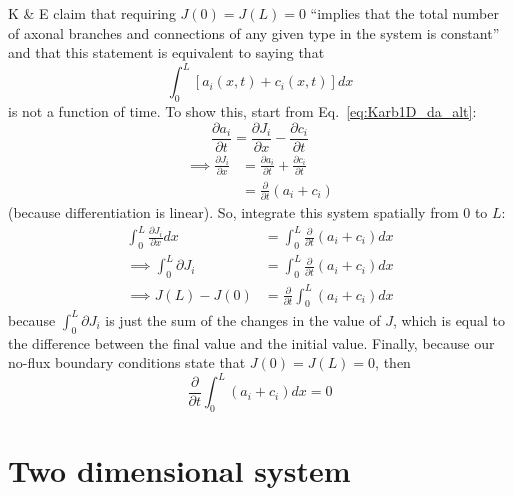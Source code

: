 \documentclass[11pt, a4paper]{article}
\begin{document}
K \& E claim
that requiring $J(0)=J(L)=0$ ``implies that the total number of axonal
branches and connections of any given type in the system is
constant'' and that this statement is equivalent to saying that
%
\begin{equation}
\int_{0}^{L} [a_i(x,t) + c_i(x,t)] dx
\end{equation}
%
is not a function of time. To show this, start from
Eq.~\ref{eq:Karb1D_da_alt}:
%
\begin{equation}
\frac{\partial a_i}{\partial t} = \frac{\partial J_i}{\partial
x} - \frac{\partial c_i}{\partial t}
\end{equation}
%
\begin{equation}
\begin{split}
\implies \frac{\partial J_i}{\partial x} & =
\frac{\partial a_i}{\partial t}
+ \frac{\partial c_i}{\partial t} \\
& = \frac{\partial}{\partial t}(a_i + c_i)
\end{split}
\end{equation}
%
(because differentiation is linear). So, integrate this system
spatially from $0$ to $L$:
%
\begin{equation}
\begin{split}
\int_0^L \frac{\partial J_i}{\partial x} dx & =
\int_0^L  \frac{\partial}{\partial t}(a_i + c_i) dx \\
\implies \int_0^L \partial J_i & = \int_0^L  \frac{\partial}{\partial
t}(a_i + c_i) dx \\
\implies J(L) - J(0) & = \frac{\partial}{\partial t} \int_0^L (a_i + c_i) dx
\end{split}
\end{equation}
%
because $\int_0^L \partial J_i $ is just the sum of the changes in the
value of $J$, which is equal to the difference between the final value
and the initial value. Finally, because our no-flux boundary
conditions state that $J(0) = J(L) = 0$, then
%
\begin{equation}
 \frac{\partial}{\partial t} \int_0^L (a_i + c_i) dx = 0
\end{equation}

\section{Two dimensional system}
\end{document}
